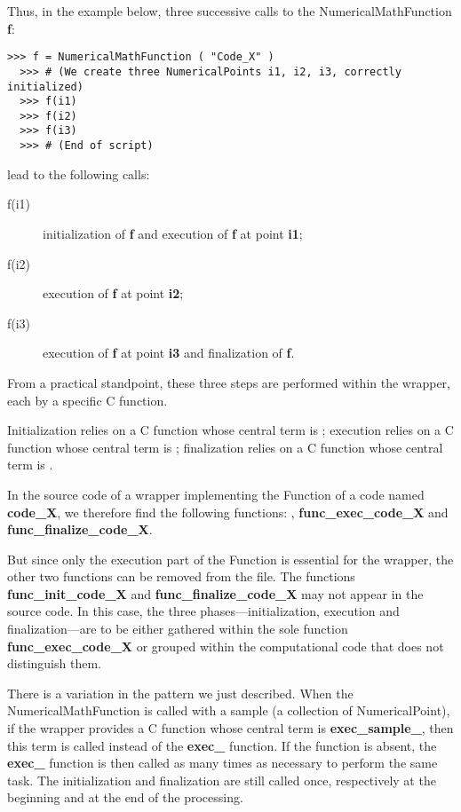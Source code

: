 Thus, in the example below, three successive calls to the NumericalMathFunction {\bf f}:
\lstset{language=C++, basicstyle=\normalsize}
\begin{lstlisting}[frame=TBRL]
  >>> f = NumericalMathFunction ( "Code_X" )
  >>> # (We create three NumericalPoints i1, i2, i3, correctly initialized)
  >>> f(i1)
  >>> f(i2)
  >>> f(i3)
  >>> # (End of script)
\end{lstlisting}

lead to the following calls:
\begin{description}
\item[f(i1)] initialization of {\bf f} and execution of {\bf f} at point {\bf i1};
\item[f(i2)] execution of {\bf f} at point {\bf i2};
\item[f(i3)] execution of {\bf f} at point {\bf i3} and finalization of {\bf f}.
\end{description}

From a practical standpoint, these three steps are performed within the wrapper, each by a specific C function.

Initialization relies on a C function whose central term is ; execution relies on a C function whose central term is ; finalization relies on a C function whose central term is .

In the source code of a wrapper implementing the Function of a code named {\bf code\_X}, we therefore find the following functions: , {\bf func\_exec\_code\_X} and {\bf func\_finalize\_code\_X}.

But since only the execution part of the Function is essential for the wrapper, the other two functions can be removed from the file. The functions {\bf func\_init\_code\_X} and {\bf func\_finalize\_code\_X} may not appear in the source code. In this case, the three phases---initialization, execution and finalization---are to be either gathered within the sole function {\bf func\_exec\_code\_X} or grouped within the computational code that does not distinguish them.

There is a variation in the pattern we just described. When the NumericalMathFunction is called with a sample (a collection of NumericalPoint), if the wrapper provides a C function whose central term is {\bf exec\_sample\_}, then this term is called instead of the {\bf exec\_} function. If the  function is absent, the {\bf exec\_} function is then called as many times as necessary to perform the same task. The initialization and finalization are still called once, respectively at the beginning and at the end of the processing.

